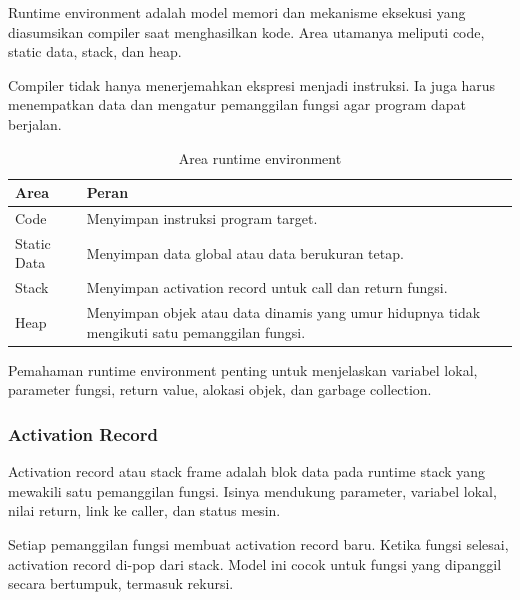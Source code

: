 \begin{jawab}
Runtime environment adalah model memori dan mekanisme eksekusi yang diasumsikan compiler saat menghasilkan kode. Area utamanya meliputi code, static data, stack, dan heap.
\end{jawab}

Compiler tidak hanya menerjemahkan ekspresi menjadi instruksi. Ia juga harus menempatkan data dan mengatur pemanggilan fungsi agar program dapat berjalan.

\begin{table}[H]
\centering
\begin{tabularx}{\textwidth}{|L{0.20\textwidth}|X|}
\hline
\textbf{Area} & \textbf{Peran} \\
\hline
Code & Menyimpan instruksi program target. \\
\hline
Static Data & Menyimpan data global atau data berukuran tetap. \\
\hline
Stack & Menyimpan activation record untuk call dan return fungsi. \\
\hline
Heap & Menyimpan objek atau data dinamis yang umur hidupnya tidak mengikuti satu pemanggilan fungsi. \\
\hline
\end{tabularx}
\caption{Area runtime environment}
\label{tab:runtime-environment}
\end{table}

Pemahaman runtime environment penting untuk menjelaskan variabel lokal, parameter fungsi, return value, alokasi objek, dan garbage collection.

\subsubsection{Activation Record}

\begin{jawab}
Activation record atau stack frame adalah blok data pada runtime stack yang mewakili satu pemanggilan fungsi. Isinya mendukung parameter, variabel lokal, nilai return, link ke caller, dan status mesin.
\end{jawab}

Setiap pemanggilan fungsi membuat activation record baru. Ketika fungsi selesai, activation record di-pop dari stack. Model ini cocok untuk fungsi yang dipanggil secara bertumpuk, termasuk rekursi.

